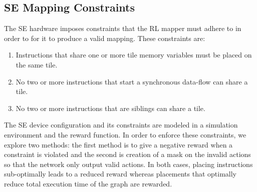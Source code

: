 \subsection{SE Mapping Constraints}
The SE hardware imposes constraints that the RL mapper must adhere to in order to for it to produce a valid mapping. These constraints are:
\begin{enumerate}
  \item Instructions that share one or more tile memory variables must be placed on the same tile.
  \item No two or more instructions that start a synchronous data-flow can share a tile.
  \item No two or more instructions that are siblings can share a tile.
\end{enumerate}
The SE device configuration and its constraints are modeled in a simulation environment and the reward function.
In order to enforce these constraints, we explore two methods: the first method is to give a negative reward when a 
constraint is violated and the second is creation of a mask on the invalid actions so that the network only output valid actions.
In both cases, placing instructions sub-optimally leads to a reduced reward whereas placements that optimally reduce total execution time of the graph are rewarded. 